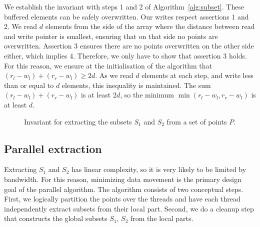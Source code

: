 We establish the invariant with steps 1 and 2 of Algorithm~\ref{alg:subset}.
These buffered elements can be safely overwritten.
Our writes respect assertions 1 and 2.
We read $d$ elements from the side of the array where the distance between read and write pointer is smallest, ensuring that on that side no points are overwritten.
Assertion 3 ensures there are no points overwritten on the other side either, which implies 4.
Therefore, we only have to show that assertion 3 holds.
For this reason, we ensure at the initialisation of the algorithm that $(r_l - w_l) + (r_r - w_l) \geq 2d$.
As we read $d$ elements at each step, and write less than or equal to $d$ elements, this inequality is maintained.
The sum $(r_l - w_l) + (r_r - w_l)$ is at least $2d$, so the minimum $\min(r_l - w_l, r_r - w_l)$ is at least $d$.

\begin{figure}[ht]
  \caption{Invariant for extracting the subsets $S_1$ and $S_2$ from a set of points $P$.}%
  \label{fig:invariant_qhull}%
\end{figure}

\subsection{Parallel extraction}
Extracting $S_1$ and $S_2$ has linear complexity, so it is very likely to be limited by bandwidth.
For this reason, minimizing data movement is the primary design goal of the parallel algorithm.
The algorithm consists of two conceptual steps.
First, we logically partition the points over the threads and have each thread independently extract subsets from their local part.
Second, we do a cleanup step that constructs the global subsets $S_1$, $S_2$ from the local parts.

